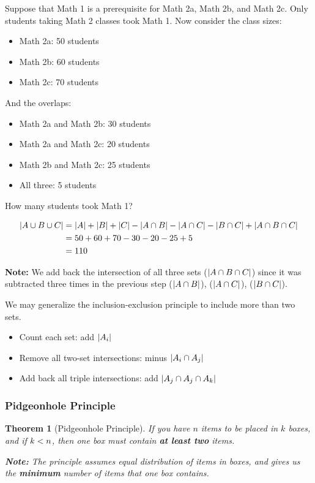 \documentclass[12pt]{article}
\DeclarePairedDelimiter\abs{\lvert}{\rvert}
\newcommand{\lt}{\ensuremath <}
\newtheorem{theorem}{Theorem}
\theoremstyle{definition}
\begin{document}
    \begin{example}
        Suppose that Math 1 is a prerequisite for Math 2a, Math 2b, and Math 2c.
        Only students taking Math 2 classes took Math 1. Now consider the class sizes:
        \begin{itemize}
            \item Math 2a: 50 students
            \item Math 2b: 60 students
            \item Math 2c: 70 students
        \end{itemize}
        And the overlaps:
        \begin{itemize}
            \item Math 2a and Math 2b: 30 students
            \item Math 2a and Math 2c: 20 students
            \item Math 2b and Math 2c: 25 students
            \item All three: 5 students
        \end{itemize}
        How many students took Math 1?

        \begin{align*}
            \abs{A \cup B \cup C} &= \abs{A} + \abs{B} + \abs{C} - \abs{A \cap B} - \abs{A \cap C} - \abs{B \cap C} + \abs{A \cap B \cap C} \\
            &= 50 + 60 + 70 - 30 - 20 - 25 + 5 \\
            &= 110
        \end{align*}

        \textbf{Note:} We add back the intersection of all three sets ($\abs{A \cap B \cap C}$)
        since it was subtracted three times in the previous step ($\abs{A \cap B}$),
        ($\abs{A \cap C}$), ($\abs{B \cap C}$).
    \end{example}
    \vspace{25px}

    We may generalize the inclusion-exclusion principle to include more than
    two sets.
    \begin{itemize}
        \item Count each set: add $\abs{A_i}$
        \item Remove all two-set intersections: minus $\abs{A_i \cap A_j}$
        \item Add back all triple intersections: add $\abs{A_j \cap A_j \cap A_k}$
    \end{itemize}

    \subsubsection{Pidgeonhole Principle}
    \begin{theorem}[Pidgeonhole Principle]
        \label{thm:pidgeonhole-principle}
        If you have $n$ items to be placed in $k$ boxes, and if $k \lt n$, then
        one box must contain \textbf{at least two} items.

        \textbf{Note:} The principle assumes equal distribution of items in boxes,
        and gives us the \textbf{minimum} number of items that one box contains.
    \end{theorem}
\end{document}
